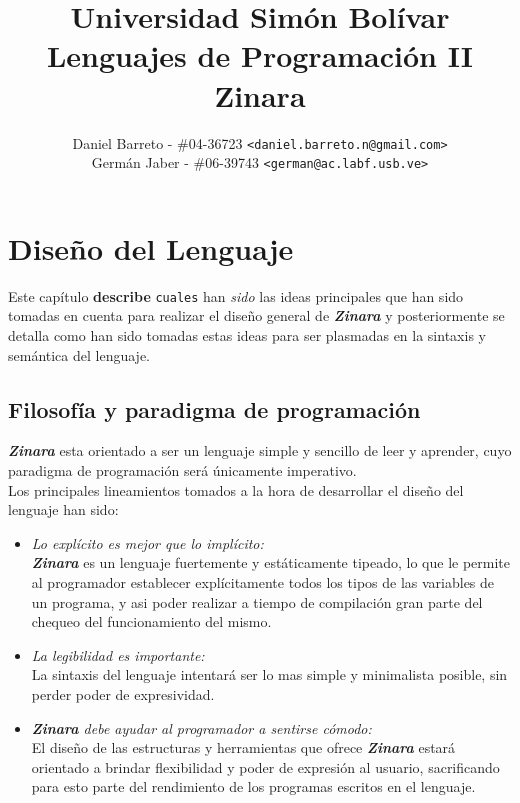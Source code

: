 \documentclass[12pt, spanish]{report}
\begin{document}
\title{Universidad Sim\'on Bol\'ivar \\ Lenguajes de Programaci\'on II \\ Zinara}
\author{
  Daniel Barreto - \#04-36723 \texttt{<daniel.barreto.n@gmail.com>} \\
  Germ\'an Jaber - \#06-39743 \texttt{<german@ac.labf.usb.ve>}
}
\maketitle

\tableofcontents

\newpage


\chapter{Dise\~no del Lenguaje}
\label{chap:diseno}

Este cap\'itulo \textbf{describe} \texttt{cuales} han \emph{sido} las ideas principales que han
sido tomadas en cuenta para realizar el dise\~no general de
\emph{\textbf{Zinara}} y posteriormente se detalla como han sido
tomadas estas ideas para ser plasmadas en la sintaxis y sem\'antica del
lenguaje.

\section{Filosof\'ia y paradigma de programaci\'on}
\label{sec:filpar}

\textbf{\emph{Zinara}} esta orientado a ser un lenguaje simple y
sencillo de leer y aprender, cuyo paradigma de programaci\'on ser\'a
\'unicamente imperativo.\\

Los principales lineamientos tomados a la hora de desarrollar el
dise\~no del lenguaje han sido:

\begin{itemize}
\item \emph{Lo expl\'icito es mejor que lo impl\'icito:}\\
  \emph{\textbf{Zinara}} es un lenguaje fuertemente y est\'aticamente
  tipeado, lo que le permite al programador establecer expl\'icitamente
  todos los tipos de las variables de un programa, y asi poder
  realizar a tiempo de compilaci\'on gran parte del chequeo del
  funcionamiento del mismo.

\item \emph{La legibilidad es importante:}\\
  La sintaxis del lenguaje intentar\'a ser lo mas simple y minimalista
  posible, sin perder poder de expresividad.

\item \emph{\textbf{Zinara} debe ayudar al programador a sentirse
    c\'omodo:}\\
  El dise\~no de las estructuras y herramientas que ofrece
  \emph{\textbf{Zinara}} estar\'a orientado a brindar flexibilidad y
  poder de expresi\'on al usuario, sacrificando para esto parte del
  rendimiento de los programas escritos en el lenguaje.
\end{itemize}
\end{document}

